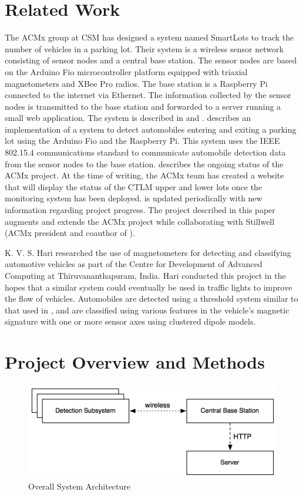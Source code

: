 \documentclass[11pt, oneside, fullpage, doublespace]{article}
\begin{document}
\section{Related Work}
The ACMx group at CSM has designed a system named SmartLots to track the number of vehicles in a parking lot. Their system is a wireless sensor network consisting of sensor nodes and a central base station. The sensor nodes are based on the Arduino Fio microcontroller platform equipped with triaxial magnetometers and XBee Pro radios. The base station is a Raspberry Pi connected to the internet via Ethernet. The information collected by the sensor nodes is transmitted to the base station and forwarded to a server running a small web application. The system is described in \cite{stillwell2013} and \cite{parkingWiki}. \cite{stillwell2013} describes an implementation of a system to detect automobiles entering and exiting a parking lot using the Arduino Fio and the Raspberry Pi. This system uses the IEEE 802.15.4 communications standard to communicate automobile detection data from the sensor nodes to the base station. \cite{parkingWiki} describes the ongoing status of the ACMx project. At the time of writing, the ACMx team has created a website that will display the status of the CTLM upper and lower lots once the monitoring system has been deployed. \cite{parkingWiki} is updated periodically with new information regarding project progress. The project described in this paper augments and extends the ACMx project while collaborating with Stillwell (ACMx president and coauthor of \cite{stillwell2013}).

K. V. S. Hari \cite{itsindia} researched the use of magnetometers for detecting and classifying automotive vehicles as part of the Centre for Development of Advanced Computing at Thiruvananthapuram, India. Hari conducted this project in the hopes that a similar system could eventually be used in traffic lights to improve the flow of vehicles. Automobiles are detected using a threshold system similar to that used in \cite{stillwell2013}, and are classified using various features in the vehicle's magnetic signature with one or more sensor axes using clustered dipole models.

\section{Project Overview and Methods}

\begin{figure}
\begin{center}
\includegraphics[width=4.5in]{architecture}
\end{center}
\caption{Overall System Architecture}
\label{fig:system}
\end{figure}
\end{document}

